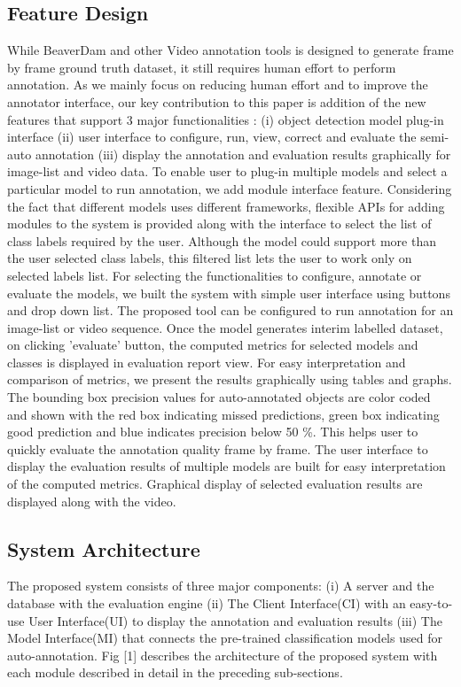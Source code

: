 \documentclass[conference]{IEEEtran}
\begin{document}
\subsection{Feature Design}
While BeaverDam\cite{dominguez2014gtgencv} and other Video annotation tools \cite{dominguez2014gtgencv} \cite{dominguez2014gtgencv}  is designed to generate frame by frame ground truth dataset, it still requires human effort to perform annotation. 
As we mainly focus on reducing human effort and to improve the annotator interface, our key contribution to this paper is addition of the new features that support 3 major functionalities : (i)  object detection model plug-in interface (ii)  user interface to configure, run, view, correct and evaluate the semi-auto annotation (iii) display the annotation and evaluation results graphically for image-list and video data.
To enable user to plug-in multiple models and select a particular model to run annotation, we add module interface feature.
Considering the fact that different models uses different frameworks, flexible APIs for adding modules to the system is provided along with the interface to select the list of class labels required by the user. Although the model could support more than the user selected class labels, this filtered list lets the user to work only on selected labels list. 
For selecting the functionalities to configure, annotate or evaluate the models, we built the system with simple user interface using buttons and drop down list. The proposed tool can be configured to run annotation for an image-list or video sequence.
Once the model generates interim labelled dataset, on clicking 'evaluate' button, the computed metrics for selected models and classes is displayed in evaluation report view. For easy interpretation and comparison of metrics, we present the results graphically using tables and graphs. 
The bounding box precision values for auto-annotated objects are color coded and shown with the red box indicating missed predictions, green box indicating good prediction and blue indicates precision below 50 \%. This helps user to quickly evaluate the annotation quality frame by frame. 
The user interface to display the evaluation results of multiple models are built for easy interpretation of the computed metrics. 
Graphical display of selected evaluation results are displayed along with the video.

\subsection{System Architecture}
The proposed system consists of three major components: (i) A server and the database with the evaluation engine (ii) The Client Interface(CI) with an easy-to-use User Interface(UI) to display the annotation and evaluation results (iii) The Model Interface(MI) that connects the pre-trained classification models used for auto-annotation. Fig [1]  describes the architecture of the proposed system with each module described in detail in the preceding sub-sections. 
\end{document}
